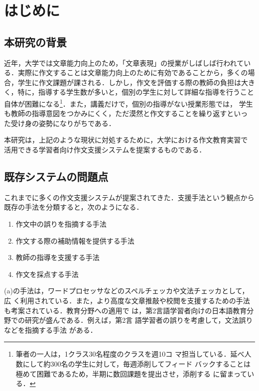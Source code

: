\documentclass[japanese]{jnlp_1.4}
\def\mod{}
\def\modk{}
\begin{document}
\maketitle

{\mod
\section{はじめに}

\subsection{本研究の背景}\label{ssec:background}

近年，大学では文章能力向上のため，「文章表現」の授業がしばしば行われてい
る．実際に作文することは文章能力向上のために有効であることから，多くの場
合，学生に作文課題が課される．しかし，作文を評価する際の教師の負担は大き
く，特に，指導する学生数が多いと，個別の学生に対して詳細な指導を行うこと
自体が困難になる\footnote{筆者の一人は，1クラス30名程度のクラスを週10コ
マ担当している．延べ人数にして約300名の学生に対して，毎週添削してフィード
バックすることは極めて困難であるため，半期に数回課題を提出させ，添削する
に留まっている．}．{\modk また，講義だけで，個別の指導がない授業形態では，
学生も教師の指導意図をつかみにくく，ただ漠然と作文することを繰り返すといっ
た受け身の姿勢になりがちである．}

本研究は，上記のような現状に対処するために，大学における作文教育実習で
{\modk 活用できる}学習者向け作文支援システムを提案するものである．


\subsection{既存システムの問題点}\label{ssec:problems}

これまでに多くの作文支援システムが提案されてきた．支援手法という観点から
既存の手法を分類すると，次のようになる．

\begin{enumerate}
\def\theenumi{}
\item 作文中の誤りを指摘する手法
\item 作文する際の補助情報を提供する手法
\item 教師の指導を支援する手法
\item 作文を採点する手法
\end{enumerate}

(a)の手法は，ワードプロセッサなどのスペルチェッカや文法チェッカとして，広
く利用されている．また，より高度な文章推敲や校閲を支援するための手法
\cite{umemura2007,笠原健成:20010515}も考案されている．教育分野への適用で
は，第2言語学習者向けの日本語教育分野での研究が盛んである．例えば，第2言
語学習者の誤りを考慮して，文法誤りなどを指摘する手法
\cite{chodorow2000,imaeda2003,brockett2006}がある．

}
\end{document}
